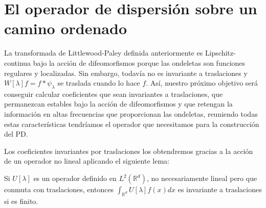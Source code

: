 \section{El operador de dispersión sobre un camino ordenado}

\noindent La transformada de Littlewood-Paley definida anteriormente es Lipschitz-continua bajo la acción de difeomorfismos porque las ondeletas son funciones regulares y localizadas. Sin embargo, todavía no es invariante a traslaciones y $W[\lambda]f=f\ast\psi_\lambda$ se traslada cuando lo hace $f$. Así, nuestro próximo objetivo será conseguir calcular coeficientes que sean invariantes a traslaciones, que permanezcan estables bajo la acción de difeomorfismos y que retengan la información en altas frecuencias que proporcionan las ondeletas, reuniendo todas estas características tendríamos el operador que necesitamos para la construcción del PD. 

\medskip 

\noindent Los coeficientes invariantes por traslaciones los obtendremos gracias a la acción de un operador no lineal aplicando el siguiente lema: 

\begin{lema} \label{lema:Invarianza_traslaciones_integral}
  Si $U[\lambda]$ es un operador definido en $L^2(\mathbb{R}^d)$, no necesariamente lineal pero que conmuta con traslaciones, entonces $\int_{\mathbb{R}^d} U[\lambda]f(x)dx$ es invariante a traslaciones si es finito.
\end{lema}

